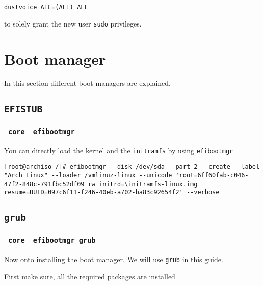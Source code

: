 \documentclass[9pt]{report}
\begin{document}
\begin{verbatim}
dustvoice ALL=(ALL) ALL
\end{verbatim}

to solely grant the new user \texttt{sudo} privileges.


\hypertarget{x-boot-manager}{\section{Boot manager}}
In this section different boot managers are explained.



\vfill\eject

\hypertarget{x-efistub}{\subsection{\texttt{EFISTUB}}}
\begin{center}
\begin{tabular}{|c|c|}
\hline
\texttt{core} & \texttt{efibootmgr} \\ 
\hline
\end{tabular}
\end{center}

You can directly load the kernel and the \texttt{initramfs} by using \texttt{efibootmgr}


\begin{verbatim}
[root@archiso /]# efibootmgr --disk /dev/sda --part 2 --create --label "Arch Linux" --loader /vmlinuz-linux --unicode 'root=6ff60fab-c046-47f2-848c-791fbc52df09 rw initrd=\initramfs-linux.img resume=UUID=097c6f11-f246-40eb-a702-ba83c92654f2' --verbose
\end{verbatim}


\vfill\eject

\hypertarget{x-grub}{\subsection{\texttt{grub}}}
\begin{center}
\begin{tabular}{|c|c|}
\hline
\texttt{core} & \texttt{efibootmgr grub} \\ 
\hline
\end{tabular}
\end{center}

Now onto installing the boot manager.
We will use \texttt{grub} in this guide.


First make sure, all the required packages are installed
\end{document}
